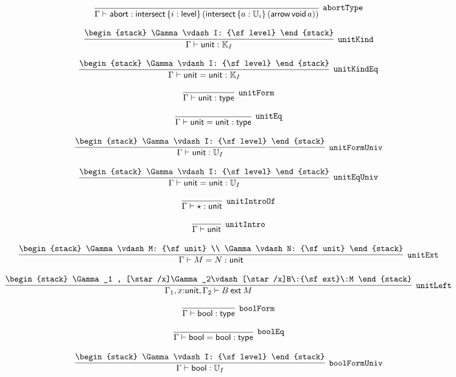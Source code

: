 \[
\infer[{\tt abortType}]{\Gamma \vdash {\sf abort}: {\sf intersect}\,\{i : {\sf level}\}\,({\sf intersect}\,\{a : {\Bbb U}_{i}\}\,({\sf arrow}\,{\sf void}\,a))}{}
\]

\[
\infer[{\tt unitKind}]{\Gamma \vdash {\sf unit}: {\Bbb K}_{I}}{
\begin{stack}
\Gamma \vdash I: {\sf level}
\end{stack}}
\]

\[
\infer[{\tt unitKindEq}]{\Gamma \vdash {\sf unit}= {\sf unit}: {\Bbb K}_{I}}{
\begin{stack}
\Gamma \vdash I: {\sf level}
\end{stack}}
\]

\[
\infer[{\tt unitForm}]{\Gamma \vdash {\sf unit}: {\sf type}}{}
\]

\[
\infer[{\tt unitEq}]{\Gamma \vdash {\sf unit}= {\sf unit}: {\sf type}}{}
\]

\[
\infer[{\tt unitFormUniv}]{\Gamma \vdash {\sf unit}: {\Bbb U}_{I}}{
\begin{stack}
\Gamma \vdash I: {\sf level}
\end{stack}}
\]

\[
\infer[{\tt unitEqUniv}]{\Gamma \vdash {\sf unit}= {\sf unit}: {\Bbb U}_{I}}{
\begin{stack}
\Gamma \vdash I: {\sf level}
\end{stack}}
\]

\[
\infer[{\tt unitIntroOf}]{\Gamma \vdash \star : {\sf unit}}{}
\]

\[
\infer[{\tt unitIntro}]{\Gamma \vdash {\sf unit}}{}
\]

\[
\infer[{\tt unitExt}]{\Gamma \vdash M= N: {\sf unit}}{
\begin{stack}
\Gamma \vdash M: {\sf unit}
\\
\Gamma \vdash N: {\sf unit}
\end{stack}}
\]

\[
\infer[{\tt unitLeft}]{\Gamma_1 ,x\mathord{:}{\sf unit}, \Gamma_2 \vdash B\:{\sf ext}\:M}{
\begin{stack}
\Gamma_1 , [\star /x]\Gamma_2\vdash [\star /x]B\:{\sf ext}\:M
\end{stack}}
\]

\[
\infer[{\tt boolForm}]{\Gamma \vdash {\sf bool}: {\sf type}}{}
\]

\[
\infer[{\tt boolEq}]{\Gamma \vdash {\sf bool}= {\sf bool}: {\sf type}}{}
\]

\[
\infer[{\tt boolFormUniv}]{\Gamma \vdash {\sf bool}: {\Bbb U}_{I}}{
\begin{stack}
\Gamma \vdash I: {\sf level}
\end{stack}}
\]

